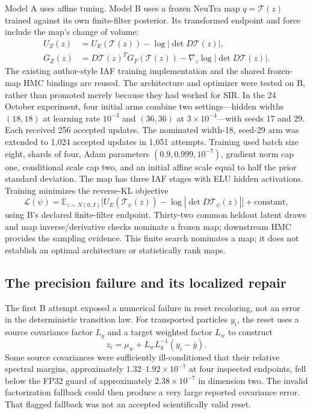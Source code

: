 Model A uses affine tuning.  Model B uses a frozen NeuTra map $q=\mathcal T(z)$
trained against its own finite-filter posterior.  Its transformed endpoint
and force include the map's change of volume:
\begin{align}
 U_Z(z)&=U_E(\mathcal T(z))-\log|\det D\mathcal T(z)|,\\
 G_Z(z)&=D\mathcal T(z)^T G_F(\mathcal T(z))
             -\nabla_z\log|\det D\mathcal T(z)|.
\end{align}
The existing author-style IAF training implementation and the shared frozen-map
HMC bindings are reused.  The architecture and optimizer were tested on B,
rather than promoted merely because they had worked for SIR.  In the 24 October experiment, four initial
arms combine two settings---hidden widths $(18,18)$ at learning rate
$10^{-3}$ and $(36,36)$ at $3\times10^{-4}$---with seeds 17 and 29.
Each received 256 accepted updates.  The nominated width-18, seed-29 arm was
extended to 1,024 accepted updates in 1,051 attempts.  Training used batch
size eight, shards of four, Adam parameters $(0.9,0.999,10^{-7})$, gradient
norm cap one, conditional scale cap two, and an initial affine scale equal
to half the prior standard deviation.  The map has three IAF stages with ELU
hidden activations.  Training minimizes the reverse-KL objective
\[
 \mathcal L(\psi)=\mathbb E_{z\sim N(0,I)}
 \bigl[U_E(\mathcal T_\psi(z))
        -\log|\det D\mathcal T_\psi(z)|\bigr]+\text{constant},
\]
using B's declared finite-filter endpoint.  Thirty-two common heldout latent
draws and map inverse/derivative checks nominate a frozen map; downstream HMC
provides the sampling evidence.  This finite search nominates a map;
it does not establish an optimal architecture or statistically rank maps.

\subsection{The precision failure and its localized repair}

The first B attempt exposed a numerical failure in reset recoloring, not an
error in the deterministic transition law.  For transported particles $y_i$,
the reset uses a source covariance factor $L_y$ and a target weighted factor
$L_w$ to construct
\[
 z_i=\mu_w+L_wL_y^{-1}(y_i-\bar y).
\]
Some source covariances were sufficiently ill-conditioned that their relative
spectral margins, approximately $1.32$--$1.92\times10^{-7}$ at four inspected
endpoints, fell below the FP32 guard of approximately
$2.38\times10^{-7}$ in dimension two.  The invalid factorization fallback
could then produce a very large reported covariance error.  That flagged
fallback was not an accepted scientifically valid reset.

